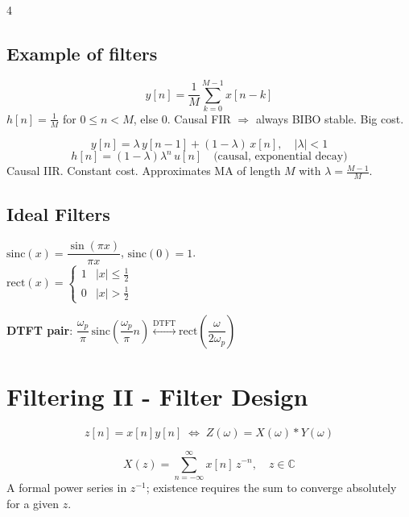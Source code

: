 \documentclass[8pt,a4paper,landscape]{extarticle}
\begin{document}
\begin{multicols*}{4}
\subsection{Example of filters}

\begin{defn}[title=Moving Average (MA)]
\[y[n]=\frac{1}{M}\sum_{k=0}^{M-1}x[n-k]\]
$h[n]=\tfrac{1}{M}$ for $0\le n<M$, else $0$.
Causal FIR $\Rightarrow$ always BIBO stable. Big cost.
\end{defn}

\begin{defn}[title=Leaky Integrator (LI)]
\[y[n]=\lambda\,y[n-1]+(1-\lambda)\,x[n], \quad |\lambda|<1\]
\[h[n]=(1-\lambda)\lambda^n\,u[n]\quad\text{(causal, exponential decay)}\]
Causal IIR. Constant cost. Approximates MA of length $M$ with $\lambda=\frac{M-1}{M}$.
\end{defn}

\subsection{Ideal Filters}

\begin{defn}[title=sinc \& rect]
$\mathrm{sinc}(x)=\dfrac{\sin(\pi x)}{\pi x}$,\; $\mathrm{sinc}(0)=1$.\qquad \\
$\mathrm{rect}(x)=\begin{cases}1&|x|\le\tfrac{1}{2}\\0&|x|>\tfrac{1}{2}\end{cases}$

\textbf{DTFT pair}: $\dfrac{\omega_p}{\pi}\,\mathrm{sinc}\!\left(\dfrac{\omega_p}{\pi}n\right)\overset{\mathrm{DTFT}}{\longleftrightarrow}\mathrm{rect}\!\left(\dfrac{\omega}{2\omega_p}\right)$
\end{defn}

\section{Filtering II - Filter Design}
\begin{thm}[title=Modulation theorem]
\[z[n]=x[n]y[n] \;\Longleftrightarrow\; Z(\omega)=X(\omega) * Y(\omega)\]
\end{thm}

\begin{defn}[title=Z-Transform]
\[X(z) = \sum_{n=-\infty}^{\infty} x[n]\,z^{-n}, \quad z\in\mathbb{C}\]
A formal power series in $z^{-1}$; existence requires the sum to converge absolutely for a given $z$.
\end{defn}


\end{multicols*}
\end{document}
